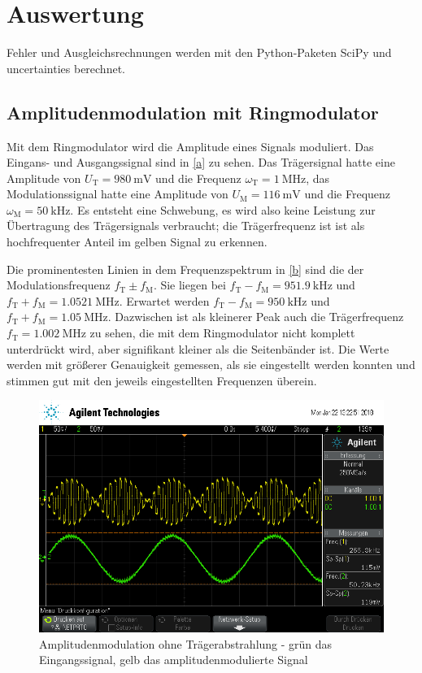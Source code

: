 \section{Auswertung}

Fehler und Ausgleichsrechnungen werden mit den Python-Paketen SciPy \cite{scipy} und uncertainties \cite{uncertain} berechnet.

\subsection{Amplitudenmodulation mit Ringmodulator}

Mit dem Ringmodulator wird die Amplitude eines Signals moduliert. Das Eingans- und Ausgangssignal sind in \autoref{a} zu sehen. Das Trägersignal hatte eine Amplitude von $U_\text{T}=\SI{980}{\milli\volt}$ und die Frequenz $\omega_\text{T}=\SI{1}{\mega\hertz}$, das Modulationssignal hatte eine Amplitude von $U_\text{M}=\SI{116}{\milli\volt}$ und die Frequenz $\omega_\text{M}=\SI{50}{\kilo\hertz}$. Es entsteht eine Schwebung, es wird also keine Leistung zur Übertragung des Trägersignals verbraucht; die Trägerfrequenz ist ist als hochfrequenter Anteil im gelben Signal zu erkennen. \par
\indent Die prominentesten Linien in dem Frequenzspektrum in \autoref{b} sind die der Modulationsfrequenz $f_\text{T} \pm f_\text{M}$. Sie liegen bei $f_\text{T} - f_\text{M} = \SI{951.9}{\kilo\hertz}$ und $f_\text{T} + f_\text{M} = \SI{1.0521}{\mega\hertz}$. Erwartet werden $f_\text{T} - f_\text{M} = \SI{950}{\kilo\hertz}$ und $f_\text{T} + f_\text{M} = \SI{1.05}{\mega\hertz}$. Dazwischen ist als kleinerer Peak auch die Trägerfrequenz $f_\text{T} = \SI{1.002}{\mega\hertz}$ zu sehen, die mit dem Ringmodulator nicht komplett unterdrückt wird, aber signifikant kleiner als die Seitenbänder ist. Die Werte werden mit größerer Genauigkeit gemessen, als sie eingestellt werden konnten und stimmen gut mit den jeweils eingestellten Frequenzen überein. \par

\begin{figure}
	\centering
	\includegraphics[width=\textwidth]{img/a_scope_230.png}
	\caption{Amplitudenmodulation ohne Trägerabstrahlung - grün das Eingangssignal, gelb das amplitudenmodulierte Signal}
	\label{a}
\end{figure}

